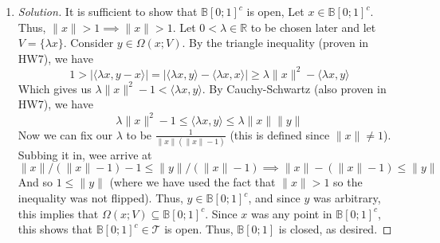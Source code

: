 \documentclass{article}
\newcommand{\R}{{\mathbb R}}
\begin{document}
\begin{enumerate}
\begin{proof}[Solution]
		Now consider the remaining case when $0 < \lVert v_i \rVert$
		where $v_i \in \{v_1, \dots, v_N\} = V$.
		Let $r = \min_i\{\lVert v_i \rVert^{-1}\}$.
		Note that since is just the minimum of a finite number of values,
		all greater than zero, we have $r > 0$ as well.
		Let $y \in \mathbb{B}[x;r)$.
		Then $\lVert y - x \rVert < r \leq \lVert v \rVert^{-1}$ for all $v \in V$.
		Thus $\lVert v \rVert\lVert y - x \rVert < 1$.
		Now using Cauchy-Schwartz (which we proved for this norm in homework 7),
		we have $|\langle v, y-x \rangle \leq \lVert v \rVert\lVert y - x \rVert < 1$,
		but this is equivalent to $-1 < \langle v, y-x \rangle < 1$,
		so $y \in \Omega(x;V)$ (since this was true for any $v \in V$),
		thus $y \in G$.
		Since $y \in \mathbb{B}[x;r)$ was arbitrary,
		this means $\mathbb{B}[x;r) \subseteq G$,
		as desired.
	\end{proof}
	\item \begin{proof}[Solution]\let\qed\relax
		It is sufficient to show that $\mathbb{B}[0;1]^c$ is open,
		Let $x \in \mathbb{B}[0;1]^c$.
		Thus, $\lVert x \rVert > 1 \implies \lVert x \rVert > 1$.
		Let $0 < \lambda \in \R$ to be chosen later and let $V = \{\lambda x\}$.
		Consider $y \in \Omega(x; V)$.
		By the triangle inequality (proven in HW7), we have
		\[
			1 > |\langle \lambda x, y - x \rangle|
			= |\langle \lambda x, y\rangle - \langle \lambda x, x\rangle|
			\geq \lambda\lVert x \rVert^2 - \langle \lambda x, y \rangle
		\]
		Which gives us $\lambda\lVert x \rVert^2 - 1 < \langle \lambda x, y \rangle$.
		By Cauchy-Schwartz (also proven in HW7), we have
		\[
			\lambda\lVert x \rVert^2 - 1 \leq \langle \lambda x, y \rangle \leq
			\lambda \lVert x \rVert \lVert y \rVert
		\]
		Now we can fix our $\lambda$ to be $\frac{1}{\lVert x \rVert(\lVert x \rVert - 1)}$
		(this is defined since $\lVert x \rVert \neq 1$).
		Subbing it in, wee arrive at
		\[
			\lVert x \rVert/(\lVert x \rVert - 1) - 1 \leq
			\lVert y \rVert/(\lVert x \rVert - 1)
			\implies
			\lVert x \rVert - (\lVert x \rVert - 1) \leq \lVert y \rVert
		\]
		And so $1 \leq \lVert y \rVert$
		(where we have used the fact that $\lVert x \rVert > 1$
		so the inequality was not flipped).
		Thus, $y \in \mathbb{B}[0;1]^c$,
		and since $y$ was arbitrary, this implies that
		$\Omega(x;V) \subseteq \mathbb{B}[0;1]^c$.
		Since $x$ was any point in $\mathbb{B}[0;1]^c$,
		this shows that $\mathbb{B}[0;1]^c \in \mathcal{T}$ is open.
		Thus, $\mathbb{B}[0;1]$ is closed, as desired.
	\end{proof}
\end{enumerate}
\clearpage
\end{document}
